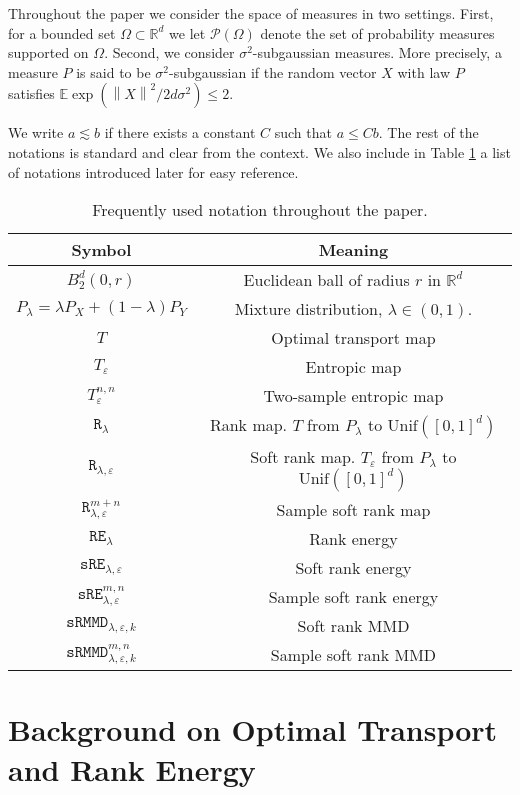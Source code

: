 \documentclass{article}
\theoremstyle{definition}
\newcommand{\sR}{\mathtt{R}_{\lambda,\varepsilon}}
\newcommand{\sRn}{\mathtt{R}_{\lambda,\varepsilon}^{m+n}}
\newcommand{\R}{\mathtt{R}_{\lambda}}
\newcommand{\sRE}{\mathtt{sRE}_{\lambda,\varepsilon}}
\newcommand{\sREn}{\mathtt{sRE}_{\lambda, \varepsilon}^{m,n}}
\newcommand{\RE}{\mathtt{RE}_{\lambda}}
\newcommand{\sRMMD}{\mathtt{sRMMD}_{\lambda,\varepsilon, k}}
\newcommand{\sRMMDn}{\mathtt{sRMMD}_{\lambda,\varepsilon, k}^{m,n}}
\newcommand{\Teps}{T_\varepsilon}
\newcommand{\norm}[1]{\left\lVert#1\right\rVert}
\begin{document}
Throughout the paper we consider the space of measures in two settings. First, for a bounded set $\Omega \subset \mathbb{R}^d$ we  let $\mathcal{P}(\Omega)$ denote the set of probability measures supported on $\Omega$. Second, we consider $\sigma^2$-subgaussian measures.  More precisely, a measure $P$ is said to be $\sigma^2$-subgaussian if the random  vector $X$ with law $P$ satisfies $\mathbb{E}\exp(\norm{X}^2/2d\sigma^2) \leq 2$.

We write $a\lesssim b$ if there exists a constant $C$ such that $a\leq Cb$. The rest of the notations is standard and clear from the context. We also include in Table \ref{tab:notation} a list of notations introduced later for easy reference.
\begin{table}[ht]
\centering
\begin{tabular}{|c|c|}
\hline
 Symbol & Meaning  \\ \hline \hline
 $B_2^d(0,r)$ & Euclidean ball of radius $r$ in $\mathbb{R}^d$ \\ \hline 
 $P_\lambda = \lambda P_X + (1-\lambda)P_Y$ & Mixture distribution, $\lambda \in (0,1)$. \\ \hline 
 $T$ & Optimal transport map \\ \hline
 $\Teps$ & Entropic map \\ \hline
 $\Teps^{n,n}$ & Two-sample entropic map \\ \hline
 $\R$ & Rank map. $T$ from $P_\lambda$ to $\text{Unif}([0,1]^d)$ \\ \hline
 $\sR$ & Soft rank map. $\Teps$ from $P_\lambda$ to $\text{Unif}([0,1]^d)$ \\ \hline
 $\sRn$ & Sample soft rank map \\ \hline
 $\RE$ & Rank energy \\ \hline
 $\sRE$ & Soft rank energy \\ \hline
 $\sREn$ & Sample soft rank energy \\ \hline 
 $\sRMMD$ & Soft rank MMD \\ \hline 
 $\sRMMDn$ & Sample soft rank MMD \\ \hline
\end{tabular}
\caption{Frequently used notation throughout the paper.} \label{tab:notation}
\end{table}

\section{Background on Optimal Transport and Rank Energy} \label{sec:background}
\end{document}
